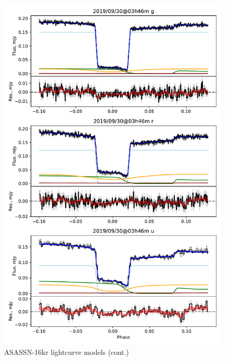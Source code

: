 \begin{figure}
    \centering
    \includegraphics[width=\textwidth]{figures/results/three_cvs_with_weird_colours/ASASSN-16kr/ASASSN-16kr_7.pdf}
    \caption{ASASSN-16kr lightcurve models (cont.)}
    \label{fig:ASASSN-16kr all lightcurves cont 6}
\end{figure}
\clearpage


